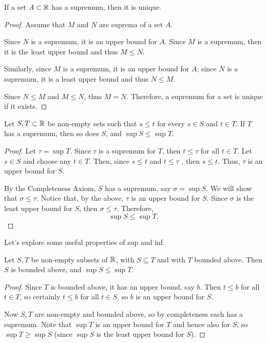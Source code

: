 \begin{proposition}
If a set $A \subset \mathbb R$ has a supremum, then it is unique.
\end{proposition}

\begin{proof}
Assume that $M$ and $N$ are suprema of a set $A$.

Since $N$ is a supremum, it is an upper bound for $A$. Since $M$ is a supremum, then it is the least upper bound and thus $M \le N$. 

Similarly, since $M$ is a supremum, it is an upper bound for $A$; since $N$ is a supremum, it is a least upper bound and thus $N \le M$. 

Since $N \le M$ and $M \le N$, thus $M = N$. Therefore, a supremum for a set is unique if it exists.
\end{proof}

\begin{theorem}
Let $S, T \subset \mathbb R$ be non-empty sets such that $s \le t$ for every $s \in S$ and $t \in T$. If $T$ has a supremum, then so does $S$, and $\sup S \le \sup T$.
\end{theorem}

\begin{proof}
Let $\tau = \sup T$. Since $\tau$ is a supremum for $T$, then $t \le \tau$ for all $t \in T$. Let $s \in S$ and choose any $t \in T$. Then, since $s \le t$ and $t \le \tau$ , then $s \le t$. Thus, $\tau$ is an upper bound for $S$. 

By the Completeness Axiom, $S$ has a supremum, say $\sigma = \sup S$. We will show that $\sigma \le \tau$. Notice that, by the above, $\tau$ is an upper bound for $S$. Since $\sigma$ is the least upper bound for $S$, then $\sigma \le \tau$. Therefore,
\[\sup S \le \sup T.\]
\end{proof}

Let's explore some useful properties of sup and inf.

\begin{proposition}
Let $S, T$ be non-empty subsets of $\mathbb R$, with $S \subseteq T$ and with $T$ bounded above. Then $S$ is bounded above, and $\sup S \le \sup T$.
\end{proposition}
\begin{proof}
Since $T$ is bounded above, it has an upper bound, say $b$. Then $t \le b$ for all $t \in T$, so certainly $t \le b$ for all $t \in S$, so $b$ is an upper bound for $S$.

Now $S, T$ are non-empty and bounded above, so by completeness each has a supremum. Note that $\sup T$ is an upper bound for $T$ and hence also for $S$, so $\sup T \ge \sup S$ (since $\sup S$ is the least upper bound for $S$).
\end{proof}

